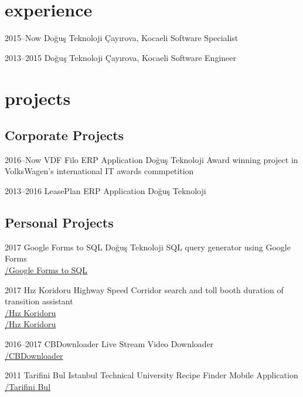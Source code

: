 \documentclass[]{../friggeri-cv} %
\begin{document}
\section{experience}

\begin{entrylist}

\entry
{2015--Now}
{Doğuş Teknoloji}
{Çayırova, Kocaeli}
{Software Specialist}

\entry
{2013--2015}
{Doğuş Teknoloji}
{Çayırova, Kocaeli}
{Software Engineer}

\end{entrylist}

\section{projects}

\subsection{Corporate Projects}

\begin{entrylist}

\entry
{2016--Now}
{VDF Filo ERP Application}
{Doğuş Teknoloji}
{Award winning project in VolksWagen's international IT awards commpetition}

\entry
{2013--2016}
{LeasePlan ERP Application}
{Doğuş Teknoloji}
{}

\end{entrylist}

\subsection{Personal Projects}

\begin{entrylist}

\entry
{2017}
{Google Forms to SQL}
{Doğuş Teknoloji}
{SQL query generator using Google Forms
\\\href{https://github.com/suphero/Google-Forms-to-SQL}{\faGithub/Google Forms to SQL}}

\entry
{2017}
{Hız Koridoru}
{}
{Highway Speed Corridor search and toll booth duration of transition assistant
\\\href{https://play.google.com/store/apps/details?id=com.harunsokullu.speedcorridor}{\faAndroid/Hız Koridoru}
\\\href{https://itunes.apple.com/tr/app/h\%C4\%B1z-koridoru/id1265151812}{\faApple/Hız Koridoru}}

\entry
{2016--2017}
{CBDownloader}
{}
{Live Stream Video Downloader
\\\href{https://github.com/suphero/CBDownloader}{\faGithub/CBDownloader}}

\entry
{2011}
{Tarifini Bul}
{Istanbul Technical University}
{Recipe Finder Mobile Application
\\\href{https://play.google.com/store/apps/details?id=com.tarifinibul}{\faAndroid/Tarifini Bul}}

\end{entrylist}

\footer
\end{document}
